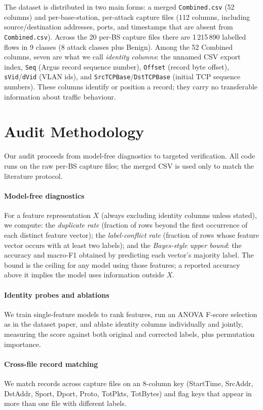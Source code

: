 \documentclass[preprint,12pt]{elsarticle}
\begin{document}
The dataset is distributed in two main forms: a merged \texttt{Combined.csv}
(52 columns) and per-base-station, per-attack capture files (112 columns,
including source/destination addresses, ports, and timestamps that are absent
from \texttt{Combined.csv}). Across the 20 per-BS capture files there are
1\,215\,890 labelled flows in 9 classes (8 attack classes plus Benign). Among
the 52 Combined columns, seven are what we call \emph{identity columns}: the
unnamed CSV export index, \texttt{Seq} (Argus record sequence number),
\texttt{Offset} (record byte offset), \texttt{sVid}/\texttt{dVid} (VLAN ids),
and \texttt{SrcTCPBase}/\texttt{DstTCPBase} (initial TCP sequence numbers).
These columns identify or position a record; they carry no transferable
information about traffic behaviour.

\section{Audit Methodology}
\label{sec:method}

Our audit proceeds from model-free diagnostics to targeted verification. All
code runs on the raw per-BS capture files; the merged CSV is used only to match
the literature protocol.

\paragraph{Model-free diagnostics} For a feature representation $X$ (always
excluding identity columns unless stated), we compute: the \emph{duplicate
rate} (fraction of rows beyond the first occurrence of each distinct feature
vector); the \emph{label-conflict rate} (fraction of rows whose feature vector
occurs with at least two labels); and the \emph{Bayes-style upper bound}: the
accuracy and macro-F1 obtained by predicting each vector's majority label. The
bound is the ceiling for any model using those features; a reported accuracy
above it implies the model uses information outside $X$.

\paragraph{Identity probes and ablations} We train single-feature models to
rank features, run an ANOVA F-score selection as in the dataset paper, and
ablate identity columns individually and jointly, measuring the score against
both original and corrected labels, plus permutation importance.

\paragraph{Cross-file record matching} We match records across capture files on
an 8-column key (StartTime, SrcAddr, DstAddr, Sport, Dport, Proto, TotPkts,
TotBytes) and flag keys that appear in more than one file with different labels.
\end{document}
